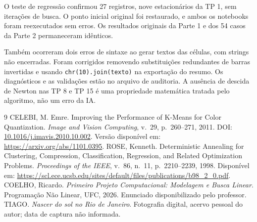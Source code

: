 \documentclass[12pt,a4paper]{article}
\begin{document}
O teste de regressão confirmou 27 registros, nove estacionários da TP 1,
sem iterações de busca. O ponto inicial original foi restaurado, e ambos
os notebooks foram reexecutados sem erros. Os resultados originais da
Parte 1 e dos 54 casos da Parte 2 permaneceram idênticos.

Também ocorreram dois erros de sintaxe ao gerar textos das células, com
strings não encerradas. Foram corrigidos removendo substituições
redundantes de barras invertidas e usando \texttt{chr(10).join(texto)}
na exportação do resumo. Os diagnósticos e as validações estão no arquivo
de auditoria. A ausência de descida de Newton nas TP 8 e TP 15 é uma
propriedade matemática tratada pelo algoritmo, não um erro da IA.

\begin{thebibliography}{9}
 CELEBI, M. Emre. Improving the Performance of K-Means
for Color Quantization. \textit{Image and Vision Computing}, v.~29,
p.~260--271, 2011. DOI: \href{https://doi.org/10.1016/j.imavis.2010.10.002}
{10.1016/j.imavis.2010.10.002}.
Versão disponível em: \url{https://arxiv.org/abs/1101.0395}.
 ROSE, Kenneth. Deterministic Annealing for Clustering,
Compression, Classification, Regression, and Related Optimization Problems.
\textit{Proceedings of the IEEE}, v.~86, n.~11, p.~2210--2239, 1998.
Disponível em: \url{https://scl.ece.ucsb.edu/sites/default/files/publications/b98_2_0.pdf}.
 COELHO, Ricardo. \textit{Primeiro Projeto Computacional:
Modelagem e Busca Linear}. Programação Não Linear, UFC, 2026. Enunciado
disponibilizado pelo professor.
 TIAGO. \textit{Nascer do sol no Rio de Janeiro}. Fotografia
digital, acervo pessoal do autor; data de captura não informada.
\end{thebibliography}
\end{document}

